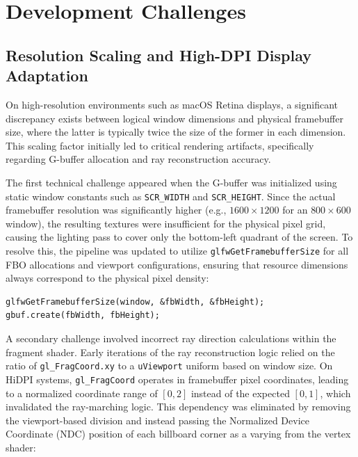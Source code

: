 \documentclass[12pt, a4paper]{article}
\begin{document}
\section{Development Challenges}

\subsection{Resolution Scaling and High-DPI Display Adaptation}

On high-resolution environments such as macOS Retina displays, a significant discrepancy exists between logical window dimensions and physical framebuffer size, where the latter is typically twice the size of the former in each dimension. This scaling factor initially led to critical rendering artifacts, specifically regarding G-buffer allocation and ray reconstruction accuracy. 

The first technical challenge appeared when the G-buffer was initialized using static window constants such as \texttt{SCR\_WIDTH} and \texttt{SCR\_HEIGHT}. Since the actual framebuffer resolution was significantly higher (e.g., $1600 \times 1200$ for an $800 \times 600$ window), the resulting textures were insufficient for the physical pixel grid, causing the lighting pass to cover only the bottom-left quadrant of the screen. To resolve this, the pipeline was updated to utilize \texttt{glfwGetFramebufferSize} for all FBO allocations and viewport configurations, ensuring that resource dimensions always correspond to the physical pixel density:

\begin{lstlisting}[style=cppstyle]
glfwGetFramebufferSize(window, &fbWidth, &fbHeight);
gbuf.create(fbWidth, fbHeight);
\end{lstlisting}

A secondary challenge involved incorrect ray direction calculations within the fragment shader. Early iterations of the ray reconstruction logic relied on the ratio of \texttt{gl\_FragCoord.xy} to a \texttt{uViewport} uniform based on window size. On HiDPI systems, \texttt{gl\_FragCoord} operates in framebuffer pixel coordinates, leading to a normalized coordinate range of $[0, 2]$ instead of the expected $[0, 1]$, which invalidated the ray-marching logic. This dependency was eliminated by removing the viewport-based division and instead passing the Normalized Device Coordinate (NDC) position of each billboard corner as a varying from the vertex shader:
\end{document}
